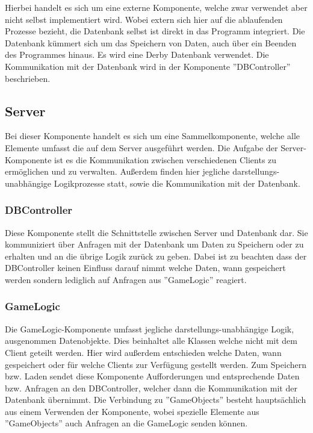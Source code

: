 \documentclass[fontsize=12pt,paper=a4,twoside]{scrartcl}
\begin{document}
Hierbei handelt es sich um eine externe Komponente, welche zwar verwendet aber nicht selbst implementiert wird. Wobei extern sich hier auf die ablaufenden Prozesse bezieht, die Datenbank selbst ist direkt in das Programm integriert. Die Datenbank kümmert sich um das Speichern von Daten, auch über ein Beenden des Programmes hinaus. Es wird eine Derby Datenbank verwendet. Die Kommunikation mit der Datenbank wird in der Komponente ''DBController'' beschrieben. 

\subsection{Server}

Bei dieser Komponente handelt es sich um eine Sammelkomponente, welche alle Elemente umfasst die auf dem Server ausgeführt werden. Die Aufgabe der Server-Komponente ist es die Kommunikation zwischen verschiedenen Clients zu ermöglichen und zu verwalten. Außerdem finden hier jegliche darstellungs-unabhängige Logikprozesse statt, sowie die Kommunikation mit der Datenbank. 

\subsubsection{DBController}

Diese Komponente stellt die Schnittstelle zwischen Server und Datenbank dar. Sie kommuniziert über Anfragen mit der Datenbank um Daten zu Speichern oder zu erhalten und an die übrige Logik zurück zu geben. Dabei ist zu beachten dass der DBController keinen Einfluss darauf nimmt welche Daten, wann gespeichert werden sondern lediglich auf Anfragen aus ''GameLogic'' reagiert.

\subsubsection{GameLogic}

Die GameLogic-Komponente umfasst jegliche darstellungs-unabhängige Logik, ausgenommen Datenobjekte. Dies beinhaltet alle Klassen welche nicht mit dem Client geteilt werden. Hier wird außerdem entschieden welche Daten, wann gespeichert oder für welche Clients zur Verfügung gestellt werden. Zum Speichern bzw. Laden sendet diese Komponente Aufforderungen und entsprechende Daten bzw. Anfragen an den DBController, welcher dann die Kommunikation mit der Datenbank übernimmt. Die Verbindung zu ''GameObjects'' besteht hauptsächlich aus einem Verwenden der Komponente, wobei spezielle Elemente aus ''GameObjects'' auch Anfragen an die GameLogic senden können.
\end{document}
